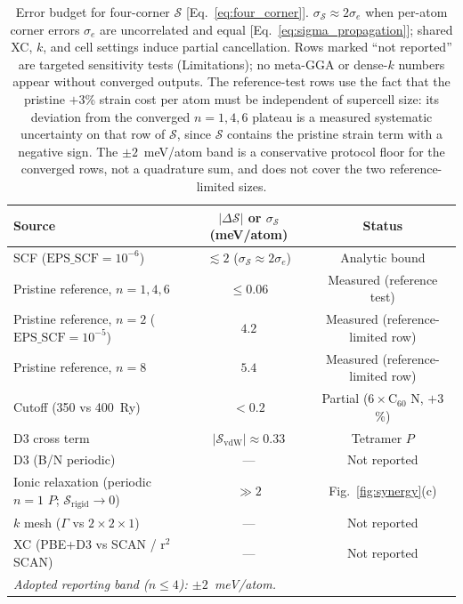 \begin{table}[t]
\caption{\label{tab:sigma_S}Error budget for four-corner $\mathcal{S}$ [Eq.~\eqref{eq:four_corner}].
$\sigma_{\mathcal{S}}\approx 2\sigma_e$ when per-atom corner errors $\sigma_e$ are uncorrelated and equal [Eq.~\eqref{eq:sigma_propagation}]; shared XC, $k$, and cell settings induce partial cancellation.
Rows marked ``not reported'' are targeted sensitivity tests (Limitations); no meta-GGA or dense-$k$ numbers appear without converged outputs.
The reference-test rows use the fact that the pristine $+3$\% strain cost per atom must be independent of supercell size: its deviation from the converged $n{=}1,4,6$ plateau is a measured systematic uncertainty on that row of $\mathcal{S}$, since $\mathcal{S}$ contains the pristine strain term with a negative sign.
The $\pm 2$~meV/atom band is a conservative protocol floor for the converged rows, not a quadrature sum, and does not cover the two reference-limited sizes.}
\begin{ruledtabular}
\begin{tabular}{lcc}
Source & $|\Delta\mathcal{S}|$ or $\sigma_{\mathcal{S}}$ (meV/atom) & Status \\
\hline
SCF ($\mathrm{EPS\_SCF}=10^{-6}$) & $\lesssim 2$ ($\sigma_{\mathcal{S}}\approx 2\sigma_e$) & Analytic bound \\
Pristine reference, $n{=}1,4,6$ & $\leq 0.06$ & Measured (reference test) \\
Pristine reference, $n{=}2$ ($\mathrm{EPS\_SCF}=10^{-5}$) & $4.2$ & Measured (reference-limited row) \\
Pristine reference, $n{=}8$ & $5.4$ & Measured (reference-limited row) \\
Cutoff (350 vs 400~Ry) & $<0.2$ & Partial ($6\times\mathrm{C}_{60}$ N, $+3$\%) \\
D3 cross term & $|\mathcal{S}_{\mathrm{vdW}}|\approx 0.33$ & Tetramer $P$ \\
D3 (B/N periodic) & --- & Not reported \\
Ionic relaxation (periodic $n{=}1$ $P$; $\mathcal{S}_{\mathrm{rigid}}{\to}0$) & $\gg 2$ & Fig.~\ref{fig:synergy}(c) \\
$k$ mesh ($\Gamma$ vs $2\times 2\times 1$) & --- & Not reported \\
XC (PBE+D3 vs SCAN / r$^2$SCAN) & --- & Not reported \\
\hline
\multicolumn{3}{l}{\emph{Adopted reporting band ($n\leq 4$): $\pm 2$~meV/atom.}} \\
\end{tabular}
\end{ruledtabular}
\end{table}
